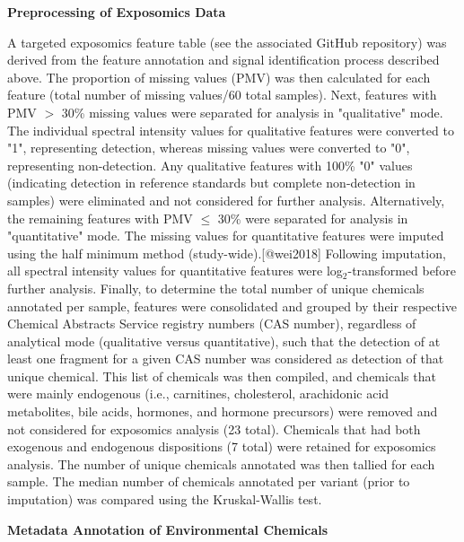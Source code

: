 \vspace{1em}

\noindent\textbf{Preprocessing of Exposomics Data}

A targeted exposomics feature table (see the associated GitHub repository) was derived from the feature annotation and signal identification process described above. 
The proportion of missing values (PMV) was then calculated for each feature (total number of missing values/60 total samples). 
Next, features with PMV $>$ 30\% missing values were separated for analysis in "qualitative" mode. 
The individual spectral intensity values for qualitative features were converted to "1", representing detection, whereas missing values were converted to "0", representing non-detection. 
Any qualitative features with 100\% "0" values (indicating detection in reference standards but complete non-detection in samples) were eliminated and not considered for further analysis. 
Alternatively, the remaining features with PMV $\leq$ 30\% were separated for analysis in "quantitative" mode. 
The missing values for quantitative features were imputed using the half minimum method (study-wide).[@wei2018] 
Following imputation, all spectral intensity values for quantitative features were log$_2$-transformed before further analysis. 
Finally, to determine the total number of unique chemicals annotated per sample, features were consolidated and grouped by their respective Chemical Abstracts Service registry numbers (CAS number), regardless of analytical mode (qualitative versus quantitative), such that the detection of at least one fragment for a given CAS number was considered as detection of that unique chemical. 
This list of chemicals was then compiled, and chemicals that were mainly endogenous (i.e., carnitines, cholesterol, arachidonic acid metabolites, bile acids, hormones, and hormone precursors) were removed and not considered for exposomics analysis (23 total). 
Chemicals that had both exogenous and endogenous dispositions (7 total) were retained for exposomics analysis. 
The number of unique chemicals annotated was then tallied for each sample. 
The median number of chemicals annotated per variant (prior to imputation) was compared using the Kruskal-Wallis test.

\vspace{1em}

\noindent\textbf{Metadata Annotation of Environmental Chemicals}

